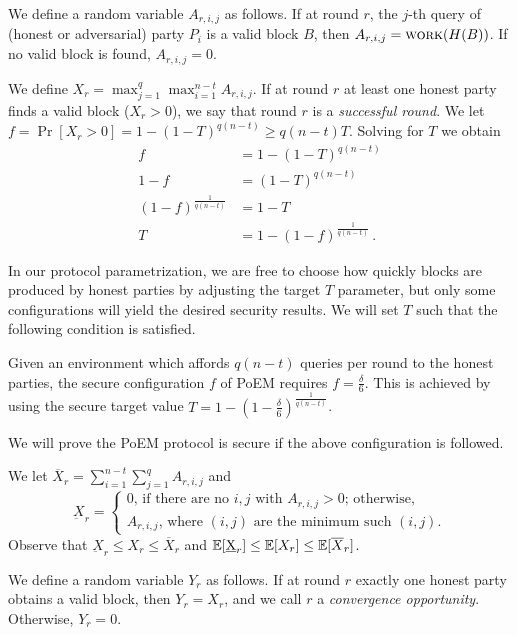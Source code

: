 We define a random variable $A_{r, i, j}$ as follows.
If at round $r$, the $j$-th query of (honest or adversarial) party $P_i$ is a valid block $B$,
then $A_{r, i, j} = \textsc{work}(H(B))$.
If no valid block is found, $A_{r, i, j} = 0$.

We define $X_{r} = \max_{j=1}^q \max_{i = 1}^{n - t} A_{r, i, j}$.
If at round $r$ at least one honest party finds a valid block ($X_r > 0$),
we say that round $r$ is a \emph{successful round}.
We let $f = \Pr[X_r > 0] = 1 - (1 - T)^{q(n - t)} \geq q(n - t)T$.
Solving for $T$ we obtain
\begin{align*}
  f &= 1 - (1 - T)^{q(n - t)}\\
  1 - f &= (1 - T)^{q(n - t)}\\
  (1 - f)^{\frac{1}{q(n - t)}} &= 1 - T\\
  T &= 1 - (1 - f)^{\frac{1}{q(n - t)}}\,.
\end{align*}

In our protocol parametrization, we are free to choose how quickly blocks are produced
by honest parties by adjusting the target $T$ parameter, but only some configurations
will yield the desired security results. We will set $T$ such that the following
condition is satisfied.

\begin{definition}
  Given an environment which affords $q (n - t)$ queries per round to
  the honest parties, the secure configuration $f$ of PoEM requires
  $f = \frac{\delta}{6}$. This is achieved by using the secure target
  value $T = 1 - (1 - \frac{\delta}{6})^{\frac{1}{q(n - t)}}$.
\end{definition}

We will prove the PoEM protocol is secure if the above configuration is
followed.

We let $\overline{X}_r = \sum_{i = 1}^{n - t} \sum_{j = 1}^q A_{r,i,j}$ and
\[
  \underbar{X}_r = \begin{cases}
  0 \text{, if there are no $i, j$ with $A_{r,i,j} > 0$; otherwise,}\\
  A_{r,i,j} \text{, where $(i, j)$ are the minimum such $(i, j)$.}
\end{cases}\]
Observe that $\underbar{X}_r \leq X_r \leq \overline{X}_r$
and $\mathop{{}\mathbb{E}}[\underbar{X}_r] \leq \mathop{{}\mathbb{E}}[X_r] \leq \mathop{{}\mathbb{E}}[\overline{X}_r]$.

We define a random variable $Y_r$ as follows.
If at round $r$ exactly one honest party obtains a valid block, then $Y_r = X_r$,
and we call $r$ a \emph{convergence opportunity}. Otherwise, $Y_r = 0$.

